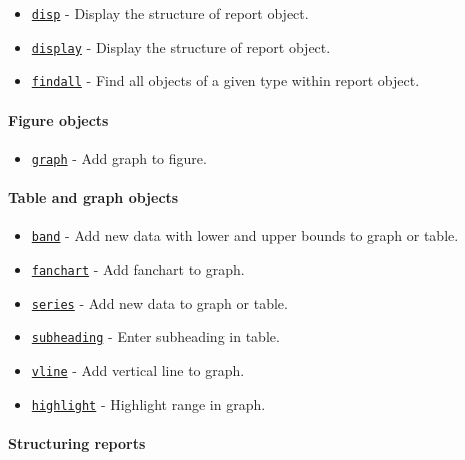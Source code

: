 \begin{itemize}
\itemsep1pt\parskip0pt
\item
  \href{report/disp}{\texttt{disp}} - Display the structure of report
  object.
\item
  \href{report/display}{\texttt{display}} - Display the structure of
  report object.
\item
  \href{report/findall}{\texttt{findall}} - Find all objects of a given
  type within report object.
\end{itemize}

\paragraph{Figure objects}

\begin{itemize}
\itemsep1pt\parskip0pt
\item
  \href{report/graph}{\texttt{graph}} - Add graph to figure.
\end{itemize}

\paragraph{Table and graph objects}

\begin{itemize}
\itemsep1pt\parskip0pt
\item
  \href{report/band}{\texttt{band}} - Add new data with lower and upper
  bounds to graph or table.
\item
  \href{report/fanchart}{\texttt{fanchart}} - Add fanchart to graph.
\item
  \href{report/series}{\texttt{series}} - Add new data to graph or
  table.
\item
  \href{report/subheading}{\texttt{subheading}} - Enter subheading in
  table.
\item
  \href{report/vline}{\texttt{vline}} - Add vertical line to graph.
\item
  \href{report/highlight}{\texttt{highlight}} - Highlight range in
  graph.
\end{itemize}

\paragraph{Structuring reports}

